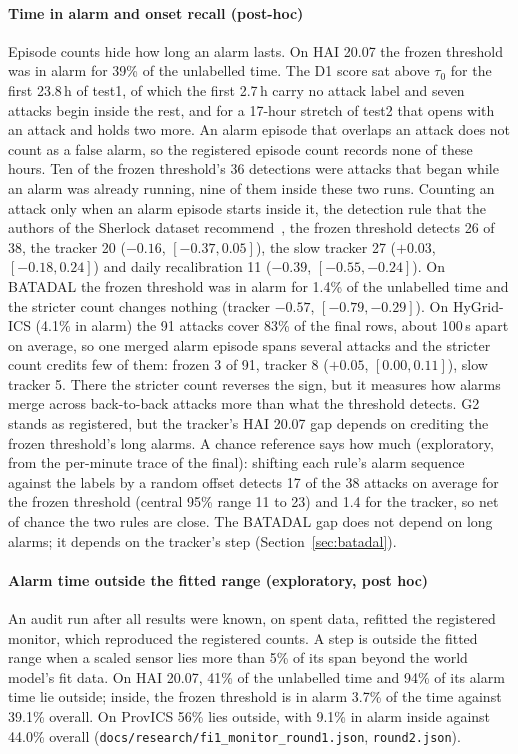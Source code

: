 \documentclass[sigconf,review,anonymous]{acmart}
\begin{document}
\paragraph{Time in alarm and onset recall (post-hoc)}
Episode counts hide how long an alarm lasts. On HAI 20.07 the frozen threshold was in alarm for 39\%
of the unlabelled time. The D1 score sat above $\tau_0$ for the first 23.8\,h of test1, of which the
first 2.7\,h carry no attack label and seven attacks begin inside the rest, and for a 17-hour stretch of test2 that opens with an attack and holds two more. An alarm episode that overlaps an attack does not count as a false
alarm, so the registered episode count records none of these hours. Ten of the frozen threshold's 36
detections were attacks that began while an alarm was already running, nine of them inside these two runs. Counting an attack
only when an alarm episode starts inside it, the detection rule that the authors of the Sherlock
dataset recommend~\cite{wagner2025sherlock}, the frozen threshold detects 26 of 38, the tracker 20
($-0.16$, $[-0.37, 0.05]$), the slow tracker 27 ($+0.03$, $[-0.18, 0.24]$) and daily recalibration 11 ($-0.39$, $[-0.55, -0.24]$). On BATADAL the frozen threshold was in alarm for 1.4\% of the unlabelled
time and the stricter count changes nothing (tracker $-0.57$, $[-0.79, -0.29]$). On HyGrid-ICS (4.1\%
in alarm) the 91 attacks cover 83\% of the final rows, about 100\,s apart on average, so one merged
alarm episode spans several attacks and the stricter count credits few of them: frozen 3 of 91,
tracker 8 ($+0.05$, $[0.00, 0.11]$), slow tracker 5. There the stricter count reverses the sign, but
it measures how alarms merge across back-to-back attacks more than what the threshold detects. G2
stands as registered, but the tracker's HAI 20.07 gap depends on crediting the frozen threshold's long
alarms. A chance reference says how much (exploratory, from the per-minute trace of the final): shifting
each rule's alarm sequence against the labels by a random offset detects 17 of the 38 attacks on
average for the frozen threshold (central 95\% range 11 to 23) and 1.4 for the tracker, so net
of chance the two rules are close. The BATADAL gap does not depend on long alarms; it depends on the
tracker's step (Section~\ref{sec:batadal}).

\paragraph{Alarm time outside the fitted range (exploratory, post hoc)}
An audit run after all results were known, on spent data, refitted the registered monitor, which
reproduced the registered counts. A step is outside the fitted range when a scaled sensor lies more
than 5\% of its span beyond the world model's fit data. On HAI 20.07, 41\% of the unlabelled time and
94\% of its alarm time lie outside; inside, the frozen threshold is in alarm 3.7\% of the time against
39.1\% overall. On ProvICS 56\% lies outside, with 9.1\% in alarm inside against 44.0\% overall
(\texttt{docs/research/fi1\_monitor\_round1.json}, \texttt{round2.json}).
\end{document}
